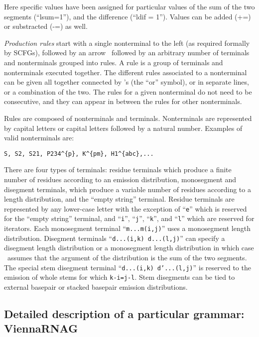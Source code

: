 \noindent 
Here specific values have been assigned for particular values of the sum of the two segments (``lsum=1''),
and the difference (``ldif = 1''). Values can be added (+=) or substracted (-=) as well.


%
 \textsl{Production rules} start with a single nonterminal to the left
 (as required formally by SCFGs), followed by an arrow \varrow\,
 followed by an arbitrary number of terminals and nonterminals grouped
 into rules. A rule is a group of terminals and nonterminals executed
 together.  The different rules associated to a nonterminal can be
 given all together connected by \orr's (the ``or'' symbol), or in
 separate lines, or a combination of the two. The rules for a given
 nonterminal do not need to be consecutive, and they can appear in
 between the rules for other nonterminals.

Rules are composed of nonterminals and terminals.  Nonterminals are
represented by capital letters or capital letters followed by a
natural number.  Examples of valid nonterminals are:

\begin{verbatim}
S, S2, S21, P234^{p}, K^{pm}, H1^{abc},...
\end{verbatim}

There are four types of terminals: residue terminals
which produce a finite number of residues according to an emission
distribution, monosegment and disegment terminals, which produce a
variable number of residues according to a length distribution, and
the ``empty string'' terminal. Residue terminals are represented by
any lower-case letter with the exception of ``\texttt{e}'' which is
reserved for the ``empty string'' terminal, and ``\texttt{i}'',
``\texttt{j}'', ``\texttt{k}'', and ``\texttt{l}'' which are reserved
for iterators.  Each monosegment terminal ``\texttt{m...m(i,j)}'' uses
a monosegment length distribution. Disegment terminals
``\texttt{d...(i,k) d...(l,j)}'' can specify a disegment length
distribution or a monosegment length distribution in which case
\tornado\, assumes that the argument of the distribution is the sum of
the two segments. The special stem disegment terminal
``\texttt{d...(i,k) d'...(l,j)}'' is reserved to the emission of whole
stems for which \texttt{k-i=j-l}.  Stem disegments can be tied to
external basepair or stacked basepair emission distributions.


\subsection{Detailed description of a particular grammar: ViennaRNAG}

